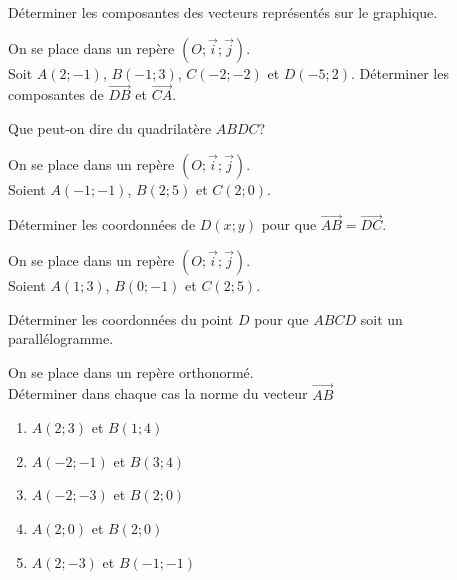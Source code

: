 \begin{exercice}
\begin{center}
\end{center}
Déterminer les composantes des vecteurs représentés sur le graphique.
\end{exercice}

\begin{exercice}
On se place dans un repère $(O;\vec{i};\vec{j})$.\\ 
Soit $A(2;-1)$, $B(-1;3)$, $C(-2;-2)$ et $D(-5;2)$.
Déterminer les composantes de $\overrightarrow{DB}$ et $\overrightarrow{CA}$. 

Que peut-on dire du quadrilatère $ABDC$?
\end{exercice}

\begin{exercice}
On se place dans un repère $(O;\vec{i};\vec{j})$.\\ 
Soient $A(-1;-1)$, $B(2;5)$ et $C(2;0)$. 

Déterminer les coordonnées de $D(x;y)$ pour que $\overrightarrow{AB}=\overrightarrow{DC}$.
\end{exercice}

\begin{exercice}
On se place dans un repère $(O;\vec{i};\vec{j})$.\\ 
Soient $A(1;3)$, $B(0;-1)$ et $C(2;5)$. 

Déterminer les coordonnées du point $D$ pour que $ABCD$ soit un parallélogramme.
\end{exercice}


\begin{exercice}
On se place dans un repère orthonormé.\\
Déterminer dans chaque cas la norme du vecteur $\overrightarrow{AB}$
\begin{enumerate}
\item $A(2;3)$ et $B(1;4)$
\item $A(-2;-1)$ et $B(3;4)$
\item $A(-2;-3)$ et $B(2;0)$
\item $A(2;0)$ et $B(2;0)$
\item $A(2;-3)$ et $B(-1;-1)$
\end{enumerate}
\end{exercice}


